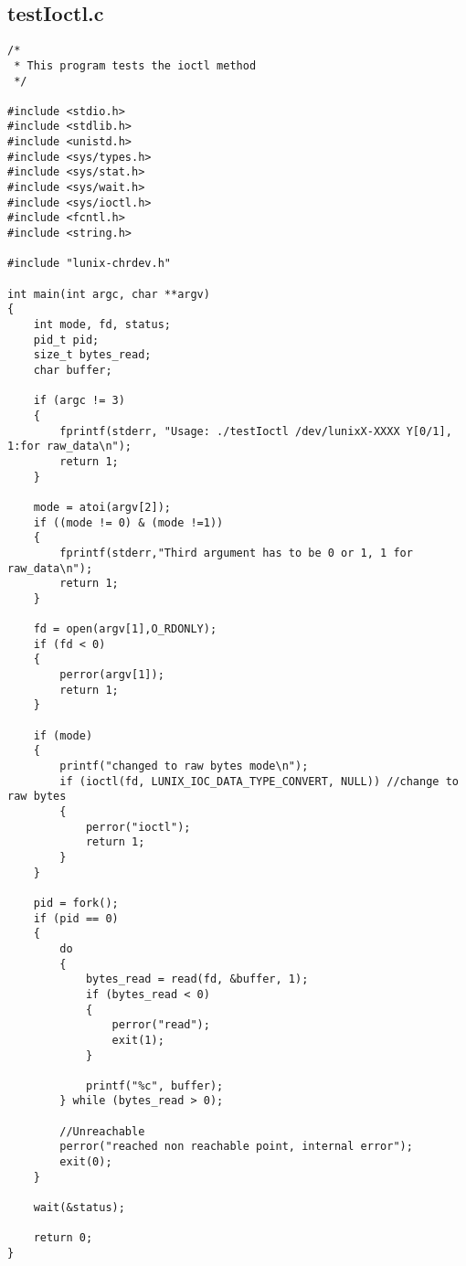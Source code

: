 \documentclass[a4paper]{article}
\begin{document}
\subsection*{testIoctl.c}
\label{sec:testIoctl.c}
\begin{lstlisting}[style=CStyle]
/*
 * This program tests the ioctl method
 */

#include <stdio.h>
#include <stdlib.h>
#include <unistd.h>
#include <sys/types.h>
#include <sys/stat.h>
#include <sys/wait.h>
#include <sys/ioctl.h>
#include <fcntl.h>
#include <string.h>

#include "lunix-chrdev.h"

int main(int argc, char **argv)
{
    int mode, fd, status;
    pid_t pid;
    size_t bytes_read;
    char buffer;

    if (argc != 3)
    {
        fprintf(stderr, "Usage: ./testIoctl /dev/lunixX-XXXX Y[0/1], 1:for raw_data\n");
        return 1;
    }

    mode = atoi(argv[2]);
    if ((mode != 0) & (mode !=1))
    {
        fprintf(stderr,"Third argument has to be 0 or 1, 1 for raw_data\n");
        return 1;
    }

    fd = open(argv[1],O_RDONLY);
    if (fd < 0)
    {
        perror(argv[1]);
        return 1;
    }

    if (mode)
    {
        printf("changed to raw bytes mode\n");
        if (ioctl(fd, LUNIX_IOC_DATA_TYPE_CONVERT, NULL)) //change to raw bytes
        {
            perror("ioctl");
            return 1;
        }
    }

    pid = fork();
    if (pid == 0)
    {
        do
        {
            bytes_read = read(fd, &buffer, 1);
            if (bytes_read < 0)
            {
                perror("read");
                exit(1);
            }

            printf("%c", buffer);
        } while (bytes_read > 0);

        //Unreachable
        perror("reached non reachable point, internal error");
        exit(0);
    }

    wait(&status);

    return 0;
}
\end{lstlisting}
\end{document}
